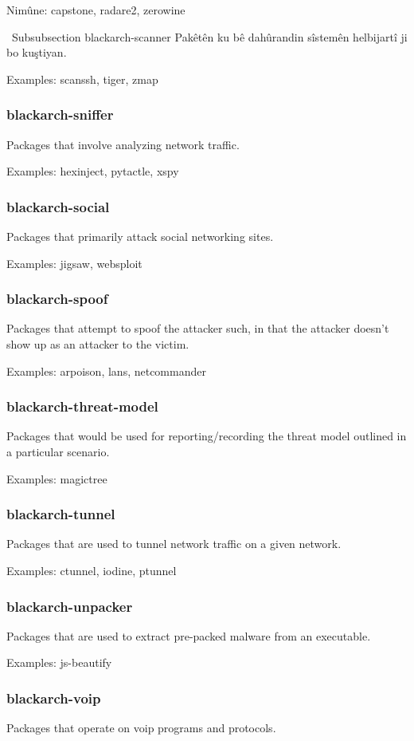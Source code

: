 Nimûne: capstone, radare2, zerowine

\ Subsubsection {blackarch-scanner}
Pakêtên ku bê dahûrandin sîstemên helbijartî ji bo kuştiyan.

Examples: scanssh, tiger, zmap

\subsubsection{blackarch-sniffer}
Packages that involve analyzing network traffic.

Examples: hexinject, pytactle, xspy

\subsubsection{blackarch-social}
Packages that primarily attack social networking sites.

Examples: jigsaw, websploit

\subsubsection{blackarch-spoof}
Packages that attempt to spoof the attacker such, in that
the attacker doesn't show up as an attacker to the victim.

Examples: arpoison, lans, netcommander

\subsubsection{blackarch-threat-model}
Packages that would be used for reporting/recording the
threat model outlined in a particular scenario.

Examples: magictree

\subsubsection{blackarch-tunnel}
Packages that are used to tunnel network traffic on a given
network.

Examples: ctunnel, iodine, ptunnel

\subsubsection{blackarch-unpacker}
Packages that are used to extract pre-packed malware from an
executable.

Examples: js-beautify

\subsubsection{blackarch-voip}
Packages that operate on voip programs and protocols.

